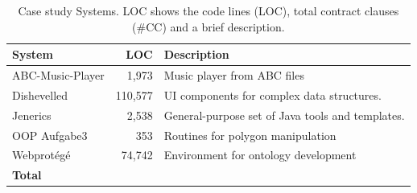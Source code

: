 

\begin{table}[ht]
\caption{Case study Systems. LOC shows the code lines (LOC), total contract clauses (\#CC) and a brief description.}
\label{tab:Units}
\centering
\begin{tabular}{lrl}
\toprule
\bfseries System &  \bfseries LOC & 
\bfseries Description  \\ \hline
ABC-Music-Player & 1,973 & Music player from ABC files  \\ 
Dishevelled & 110,577 & UI components for complex data structures.\\ 
Jenerics & 2,538 &  General-purpose set of Java tools and templates.\\ 
OOP Aufgabe3 & 353 &  Routines for polygon manipulation\\
Webprot\'{e}g\'{e} & 74,742 & Environment for ontology development \\ \hline

 \bfseries Total &  \bfseries \totalCode{} & \\
\bottomrule
\end{tabular}
\end{table}

